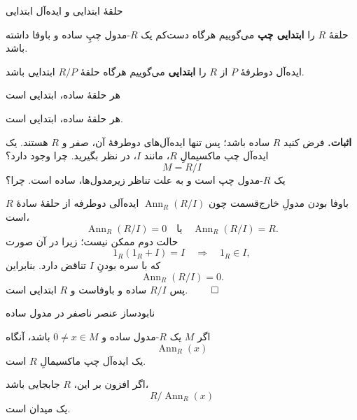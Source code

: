\begin{frame}[t]{حلقهٔ ابتدایی و ایده‌آل ابتدایی}
    \label{lec14:primitive-definitions}
    \begin{definition}
        حلقهٔ \(R\) را \textbf{ابتدایی چپ}  می‌گوییم هرگاه دست‌کم یک \(R\)-مدول چپِ ساده و باوفا داشته باشد.
    \end{definition}
    \begin{definition}
        ایده‌آل دوطرفهٔ \(P\) از \(R\) را \textbf{ابتدایی} می‌گوییم هرگاه حلقهٔ \(R/P\) ابتدایی باشد.
    \end{definition}
\end{frame}

\begin{frame}[t]{هر حلقهٔ ساده، ابتدایی است}
    \label{lec14:simple-implies-primitive}
    \begin{theorem}
        هر حلقهٔ ساده، ابتدایی است.
    \end{theorem}
    \textbf{اثبات.} فرض کنید \(R\) ساده باشد؛ پس تنها ایده‌آل‌های دوطرفهٔ آن، صفر و \(R\) هستند.
    یک ایده‌آل چپ ماکسیمالِ \(R\)، مانند \(I\)، در نظر بگیرید. \alert{چرا وجود دارد؟}
    \[
        M=R/I
    \]
    یک \(R\)-مدول چپ است و به علت تناظر زیرمدول‌ها، ساده است.
    \alert{چرا؟}
\end{frame}

\begin{frame}[t]{باوفا بودن مدولِ خارج‌قسمت}
    \label{lec14:simple-quotient-faithful}
    چون \(\operatorname{Ann}_R(R/I)\) ایده‌آلی دوطرفه از حلقهٔ سادهٔ \(R\) است،
    \[
        \operatorname{Ann}_R(R/I)=0
        \quad\text{یا}\quad
        \operatorname{Ann}_R(R/I)=R.
    \]
    حالت دوم ممکن نیست؛ زیرا در آن صورت
    \[
        1_R(1_R+I)=I\quad\Longrightarrow\quad 1_R\in I,
    \]
    که با سره بودنِ \(I\) تناقض دارد. بنابراین
    \[
        \operatorname{Ann}_R(R/I)=0.
    \]
    پس \(R/I\) ساده و باوفاست و \(R\) ابتدایی است. \hfill\(\qed\)
\end{frame}

\begin{frame}[t]{نابودساز عنصر ناصفر در مدول ساده}
    \label{lec14:simple-element-maximal}
    \begin{remark}
        اگر \(M\) یک \(R\)-مدول ساده و \(0\ne x\in M\) باشد، آنگاه
        \[
            \operatorname{Ann}_R(x)
        \]
        یک ایده‌آل چپ ماکسیمالِ \(R\) است.
    \end{remark}
    \begin{remark}
        اگر افزون بر این، \(R\) جابجایی باشد،
        \[
            R/\operatorname{Ann}_R(x)
        \]
        یک میدان است.
    \end{remark}
\end{frame}


